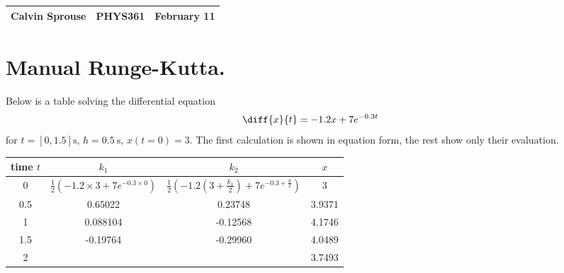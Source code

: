 \documentclass[a4paper, 12pt]{config/homework}
\begin{document}
\noindent
\begin{tabularx}{\textwidth}{>{\centering\arraybackslash}X>{\centering\arraybackslash}X>{\centering\arraybackslash}X}
Calvin Sprouse & PHYS361 & 2024 February 11\\
\midrule
\end{tabularx}

\noindent
\section*{Manual Runge-Kutta.}
Below is a table solving the differential equation
\[\diff{x}{t} = -1.2x + 7e^{-0.3t}\]
for \(t=[0,1.5]\text{s}\), \(h=\qty{0.5}{\second}\), \(x(t=0)=3\). The first calculation is shown in equation form, the rest show only their evaluation.
\begin{table}[H]
    \centering
    \begin{tabular}{cccc}
    time $t$ & $k_1$ & $k_2$ & $x$ \\ \hline
    0 & $\frac{1}{2}\left( -1.2\times 3 + 7e^{-0.3\times 0}\right)$ & $\frac{1}{2}\left( -1.2\left( 3+\frac{k_1}{2}\right) + 7e^{-0.3+\frac{h}{2}}\right)$ & 3 \\
    0.5 & 0.65022 & 0.23748 & 3.9371 \\
    1 & 0.088104 & -0.12568 & 4.1746 \\
    1.5 & -0.19764 & -0.29960 & 4.0489 \\
    2 &  &  & 3.7493
    \end{tabular}
\end{table}
\end{document}
